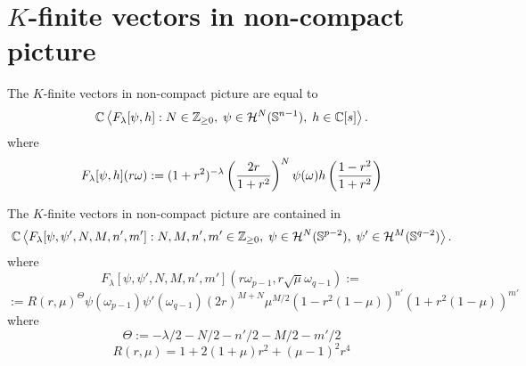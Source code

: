 \documentclass[8pt,pdf,notes]{beamer}
\theoremstyle{mystyle}
\begin{document}
\section{$K$-finite vectors in non-compact picture}
\begin{frame}
\begin{theorem}
	The $K$-finite vectors in non-compact picture are equal to
	\[\mathbb{C}\left< F_\lambda[\psi,h]:N\in\mathbb{Z}_{ \geq0 },\;\psi\in\mathcal{ H }^N(\mathbb{ S }^{ n-1 }),\;h\in\mathbb{C}[s] \right>.\]
	where
	\[F_\lambda[\psi,h](r\omega):=(1+r^2)^{ -\lambda }\left( \frac{ 2r }{ 1+r^2 } \right)^N\psi(\omega)h\left(\frac{ 1-r^2 }{1+r^2}\right)\]
\end{theorem}
\begin{theorem}[$O(p,q),\;n:=(p-1)+(q-1)$]
	The $K$-finite vectors in non-compact picture are contained in
	\[\mathbb{C}\left< F_\lambda[\psi,\psi',N,M,n',m']:N,M,n',m'\in\mathbb{Z}_{ \geq0 },
	\;\psi\in\mathcal{ H }^N(\mathbb{ S }^{ p-2 }),\;\psi'\in\mathcal{ H }^M(\mathbb{ S }^{ q-2 }) \right>.\]
	where
	\[F_\lambda[\psi,\psi',N,M,n',m'](r\omega_{ p-1 },r\sqrt{ \mu }\omega_{ q-1 }):=\]
	\[:=R(r,\mu)^\Theta\psi(\omega_{ p-1 })\psi'(\omega_{ q-1 })(2r)^{ M+N }\mu^{ M/2 }(1-r^2(1-\mu))^{ n' }(1+r^2(1-\mu))^
	{m'}\]
	where
	\[\Theta:={ -\lambda/2-N/2-n'/2-M/2-m'/2 }\]
	\[R(r,\mu)=1+2(1+\mu)r^2+(\mu-1)^2r^4\]
\end{theorem}
\end{frame}
\end{document}
